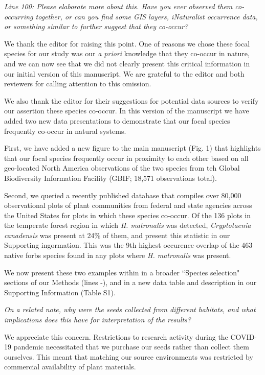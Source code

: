 \documentclass[11pt]{article}
\begin{document}
\emph{Line 100: Please elaborate more about this. Have you ever observed them co-occurring together, or can you find some GIS layers, iNaturalist occurrence data, or something similar to further suggest that they co-occur?} 

We thank the editor for raising this point. One of reasons we chose these focal species for our study was our \emph{a priori} knowledge that they co-occur in nature, and we can now see that we did not clearly present this critical information in our initial version of this manuscript. We are grateful to the editor and both reviewers for calling attention to this omission.

We also thank the editor for their suggestions for potential data sources to verify our assertion these species co-occur. In this version of the manuscript we have added two new data presentations to demonstrate that our focal species frequently co-occur in natural systems. 

First, we have added a new figure to the main manuscript (Fig. 1) that highlights that our focal species frequently occur in proximity to each other based on all geo-located North America observations of the two species from teh Global Biodiversity Information Facility (GBIF; 18,571 observations total).

Second, we queried a recently published database that compiles over 80,000 observational plots of plant communities from federal and state agencies across the United States for plots in which these species co-occur. Of the 136 plots in the temperate forest region in which \emph{H. matronalis} was detected, \emph{Cryptotaenia canadensis} was present at 24\% of them, and present this statistic in our Supporting ingormation. This was the 9th highest occurence-overlap of the 463 native forbs species found in any plots where \emph{H. matronalis} was present.

We now present these two examples within in a broader ``Species selection" sections of our Methods (lines -), and in a new data table and description in our Supporting Information (Table S1).


\emph{On a related note, why were the seeds collected from different habitats, and what implications does this have for interpretation of the results?}

We appreciate this concern. Restrictions to research activity during the COVID-19 pandemic necessitated that we purchase our seeds rather than collect them ourselves. This meant that matching our source environments was restricted by commercial availability of plant materials. 
\end{document}
